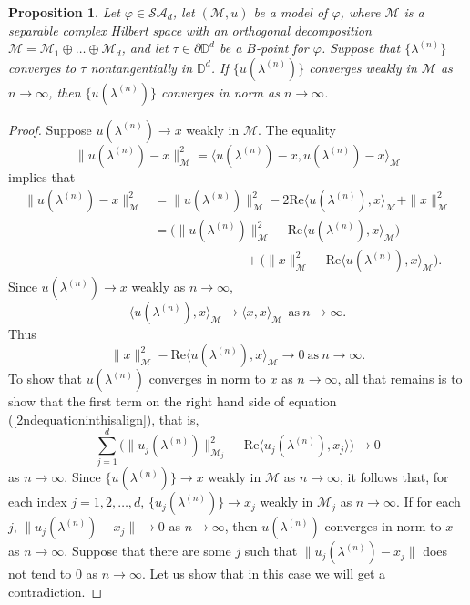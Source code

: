 \documentclass[11pt, reqno]{amsart}
\newtheorem{proposition}[theorem]{Proposition}
\newcommand\1{\boldsymbol {1}}
\numberwithin{equation}{section}
\begin{document}
\begin{proposition}\label{prop5.8cara}
Let $\varphi\in\mathcal{SA}_{d}$, let $(\mathcal{M},u)$ be a model of $\varphi$,  where  $\mathcal{M}$ is a separable complex Hilbert space with an orthogonal decomposition $\mathcal{M}=\mathcal{M}_{1}\oplus\hdots\oplus\mathcal{M}_{d}$, 
 and let $\tau\in\partial\mathbb{D}^{d}$ be a $B$-point for $\varphi$. Suppose that $\{\lambda^{(n)}\}$ converges to $\tau$ nontangentially in $\mathbb{D}^{d}$. If $\{u(\lambda^{(n)})\}$ converges weakly in $\mathcal{M}$ as $n\rightarrow \infty$, then $\{u(\lambda^{(n)})\}$ converges in norm as $n\rightarrow \infty$.
\end{proposition}
\begin{proof} Suppose  $u(\lambda^{(n)})\rightarrow x$ weakly in $\mathcal{M}$.  The equality
$$\|u(\lambda^{(n)})-x\|_{\mathcal{M}}^{2} = \langle u(\lambda^{(n)})-x,u(\lambda^{(n)})-x\rangle_{\mathcal{M}}$$
implies that
\begin{align}
\|u(\lambda^{(n)})-x\|_{\mathcal{M}}^{2}&=\|u(\lambda^{(n)})\|_{\mathcal{M}}^{2}-2\mathrm{Re} \langle u(\lambda^{(n)}),x\rangle_{\mathcal{M}} +\|x\|_{\mathcal{M}}^{2}\nonumber\\
&=\bigg(\|u(\lambda^{(n)})\|_{\mathcal{M}}^{2}-\mathrm{Re} \langle u(\lambda^{(n)}),x\rangle_{\mathcal{M}} \bigg)\nonumber\\
&\hspace{3cm}+\bigg(\|x\|_{\mathcal{M}}^{2}-\mathrm{Re} \langle u(\lambda^{(n)}),x\rangle_{\mathcal{M}} \bigg)\label{2ndequationinthisalign}.
\end{align}
Since $u(\lambda^{(n)})\rightarrow x$ weakly as $n\rightarrow\infty$, 
$$\langle u(\lambda^{(n)}),x \rangle_{\mathcal{M}} \rightarrow \langle x,x\rangle_{\mathcal{M}}~~\text{as}~n\rightarrow \infty.$$
Thus
\begin{equation}\label{equivalenceofweakconvergence}
 \|x\|_{\mathcal{M}}^{2}-\mathrm{Re} \langle u(\lambda^{(n)}),x\rangle_{\mathcal{M}} \rightarrow 0~\text{as}~n\rightarrow \infty.
\end{equation}
To show that $u(\lambda^{(n)})$ converges in norm to $x$ as $n\rightarrow \infty$, all that remains is to show that the first term on the right hand side of equation (\ref{2ndequationinthisalign}), that is, 
\begin{equation}\label{ujtoxj}
\sum_{j=1}^{d}\Big(\|u_{j}(\lambda^{(n)})\|_{\mathcal{M}_{j}}^{2}-\mathrm{Re} \langle u_{j}(\lambda^{(n)}),x_{j}\rangle \Big) \to 0
\end{equation}
as  $n\rightarrow \infty$.
Since $\{u(\lambda^{(n)})\} \to x$ weakly in $\mathcal{M}$ as $n\rightarrow \infty$, it follows that, for each index $j= 1,2, \dots, d$,  $\{u_{j}(\lambda^{(n)})\} \to x_{j}$ weakly in $\mathcal{M}_{j}$ as $n\rightarrow \infty$.
 If for each $j$, $\|u_{j}(\lambda^{(n)}) - x_j\| \to 0$  as $n\rightarrow \infty$, then $u(\lambda^{(n)})$ converges in norm to $x$ as $n\rightarrow \infty$. Suppose that there are some $j$ such that 
$\|u_{j}(\lambda^{(n)}) - x_j\|$ does not tend to $0$  as $n\rightarrow \infty$. Let us show that in this case we will get a contradiction.


\end{proof}
\end{document}
